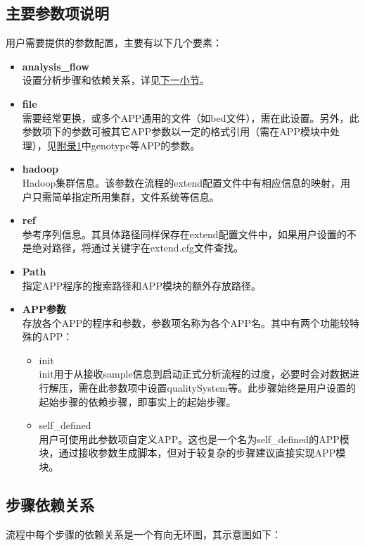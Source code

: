 \documentclass[UTF8,10pt,a4paper]{ctexart}
\begin{document}
\subsection{主要参数项说明}
用户需要提供的参数配置，主要有以下几个要素：
\begin{itemize}
\item \textbf{analysis\_flow}\\
设置分析步骤和依赖关系，详见{\kaishu \hyperref[subs5.3]{下一小节}}。
\item \textbf{file}\\
需要经常更换，或多个APP通用的文件（如bed文件），需在此设置。另外，此参数项下的参数可被其它APP参数以一定的格式引用（需在APP模块中处理），见{\kaishu \hyperref[B]{附录1}}中genotype等APP的参数。
\item \textbf{hadoop}\\
Hadoop集群信息。该参数在流程的extend配置文件中有相应信息的映射，用户只需简单指定所用集群，文件系统等信息。
\item \textbf{ref}\\
参考序列信息。其具体路径同样保存在extend配置文件中，如果用户设置的不是绝对路径，将通过关键字在extend.cfg文件查找。
\item \textbf{Path}\\
指定APP程序的搜索路径和APP模块的额外存放路径。
\item \textbf{APP参数}\\
存放各个APP的程序和参数，参数项名称为各个APP名。其中有两个功能较特殊的APP：
\begin{itemize}
\item  init \\
init用于从接收sample信息到启动正式分析流程的过度，必要时会对数据进行解压，需在此参数项中设置qualitySystem等。此步骤始终是用户设置的起始步骤的依赖步骤，即事实上的起始步骤。
\item  self\_defined \\
用户可使用此参数项自定义APP。这也是一个名为self\_defined的APP模块，通过接收参数生成脚本，但对于较复杂的步骤建议直接实现APP模块。
\end{itemize}

\end{itemize}


\subsection{步骤依赖关系}
\label{subs5.3}
流程中每个步骤的依赖关系是一个有向无环图，其示意图如下：%
\end{document}
